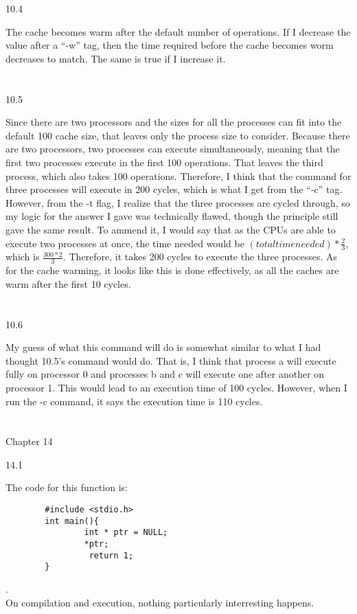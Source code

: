 \documentclass[12pt, a4paper]{article}
\begin{document}
10.4

	The cache becomes warm after the default number of operations. If I decrease the value after a ``-w'' tag, then the time required before the cache becomes worm decreases to match. The same is true if I increase it. \\ \\ \\

10.5

	Since there are two processors and the sizes for all the processes can fit into the default 100 cache size, that leaves only the process size to consider.
	Because there are two processors, two processes can execute simultaneously, meaning that the first two processes execute in the first 100 operations. That leaves the third process, which also takes 100 operations. Therefore, I think that the command for three processes will execute in 200 cycles, which is what I get from the ``-c'' tag.
	However, from the -t flag, I realize that the three processes are cycled through, so my logic for the answer I gave was technically flawed, though the principle still gave the same result.  To ammend it, I would say that as the CPUs are able to execute two processes at once, the time needed would be \((total time needed) * \frac{2}{3}\), which is \(\frac{300*2}{3}\). Therefore, it takes 200 cycles to execute the three processes. As for the cache warming, it looks like this is done effectively, as all the caches are warm after the first 10 cycles. \\ \\ \\
	
	
10.6
	
	My guess of what this command will do is somewhat similar to what I had thought 10.5's command would do. That is, I think that process a will execute fully on processor 0 and processes b and c will execute one after another on processor 1. This would lead to an execution time of 100 cycles. However, when I run the -c command, it says the execution time is 110 cycles. \\ \\ \\



\noindent
Chapter 14

14.1

	The code for this function is:
	\begin{verbatim}
		#include <stdio.h>
		int main(){
		        int * ptr = NULL;
		        *ptr;
		         return 1;
		}
	\end{verbatim}
	.\\
	On compilation and execution, nothing particularly interresting happens. \\ \\ \\
\end{document}
